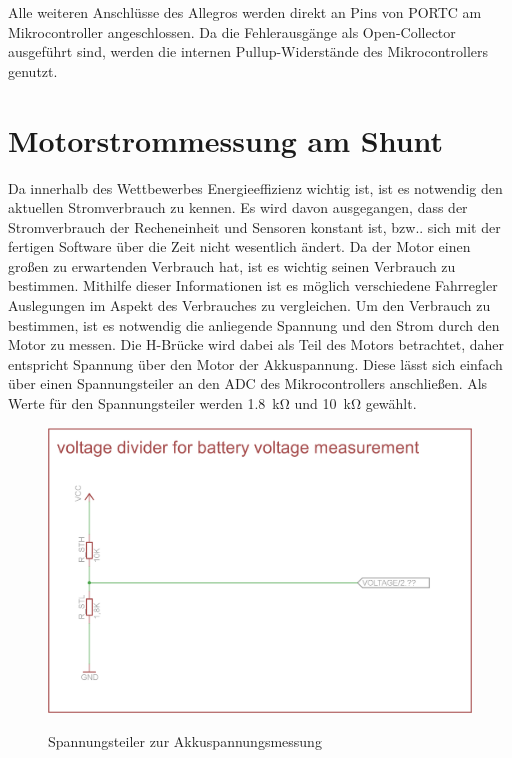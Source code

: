 Alle weiteren Anschlüsse des Allegros werden direkt an Pins von PORTC am Mikrocontroller angeschlossen. Da die Fehlerausgänge als Open-Col\-lec\-tor ausgeführt sind, werden die internen Pullup-Widerstände des Mikrocontrollers genutzt.

\section{Motorstrommessung am Shunt}

Da innerhalb des Wettbewerbes Energieeffizienz wichtig ist, ist es notwendig den aktuellen Stromverbrauch zu kennen. Es wird davon ausgegangen, dass der Stromverbrauch der Recheneinheit und Sensoren
konstant ist, bzw.. sich mit der fertigen Software über die Zeit nicht wesentlich ändert. Da der Motor einen großen zu erwartenden Verbrauch hat, ist es wichtig seinen Verbrauch zu bestimmen. Mithilfe dieser
Informationen ist es möglich verschiedene Fahrregler Auslegungen im Aspekt des Verbrauches zu vergleichen. Um den Verbrauch zu bestimmen, ist es notwendig die anliegende Spannung und den Strom durch den
Motor zu messen. Die H-Brücke wird dabei als Teil des Motors betrachtet, daher entspricht Spannung über den Motor der Akkuspannung. Diese lässt sich einfach über einen Spannungsteiler an den ADC des Mikrocontrollers
anschließen. Als Werte für den Spannungsteiler werden \SI{1,8}{\kohm} und \SI{10}{\kohm} gewählt.

\begin{figure}[H]
\centering
\includegraphics[width=\textwidth]{spannungsteiler.png}\\
\caption{Spannungsteiler zur Akkuspannungsmessung}%
\label{fig:Spannungsteiler}
\end{figure}

